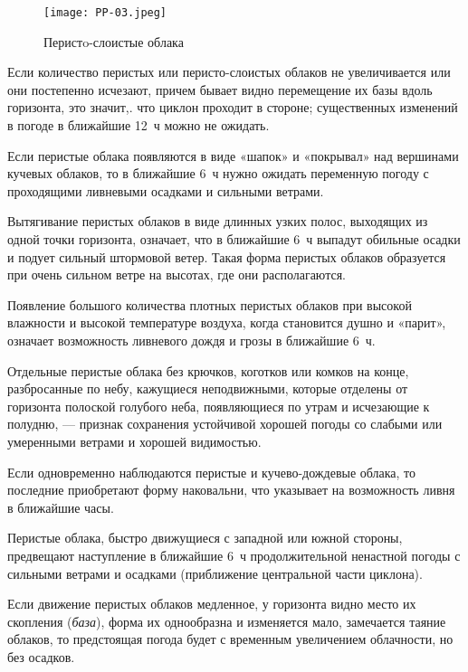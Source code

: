 \begin{figure}[htb]
  \centering{}
  \texttt{[image: PP-03.jpeg]}
  \caption{Перистo-слоистые облака}
  \label{fig:pp03}
  \small
  \centering{}
\end{figure}

 Если количество перистых или перисто-слоистых облаков не
увеличивается или они постепенно исчезают, причем бывает видно
перемещение их базы вдоль горизонта, это значит,. что циклон проходит
в стороне; существенных изменений в погоде в ближайшие 12~ч
можно не ожидать.

 Если перистые облака появляются в виде «шапок» и «покрывал» над
вершинами кучевых облаков, то в ближайшие 6~ч нужно ожидать
переменную погоду с проходящими ливневыми осадками и сильными ветрами.

 Вытягивание перистых облаков в виде длинных узких полос, выходящих
из одной точки горизонта, означает, что в ближайшие 6~ч выпадут
обильные осадки и подует сильный штормовой ветер. Такая форма перистых
облаков образуется при очень сильном ветре на высотах, где они
располагаются.

 Появление большого количества плотных перистых облаков при
высокой влажности и высокой температуре воздуха, когда становится
душно и «парит», означает возможность ливневого дождя и грозы в
ближайшие 6~ч.

 Отдельные перистые облака без крючков, коготков или комков на
конце, разбросанные по небу, кажущиеся неподвижными, которые отделены
от горизонта полоской голубого неба, появляющиеся по утрам и
исчезающие к полудню, --- признак сохранения устойчивой хорошей погоды
со слабыми или умеренными ветрами и хорошей видимостью.

 Если одновременно наблюдаются перистые и кучево-дождевые
облака, то последние приобретают форму наковальни, что указывает на
возможность ливня в ближайшие часы.

 Перистые облака, быстро движущиеся с западной или южной
стороны, предвещают наступление в ближайшие 6~ч продолжительной
ненастной погоды с сильными ветрами и осадками (приближение
центральной части циклона).

 Если движение перистых облаков медленное, у горизонта видно
место их скопления (\textit{база}), форма их однообразна и изменяется мало,
замечается таяние облаков, то предстоящая погода будет с временным
увеличением облачности, но без осадков.


